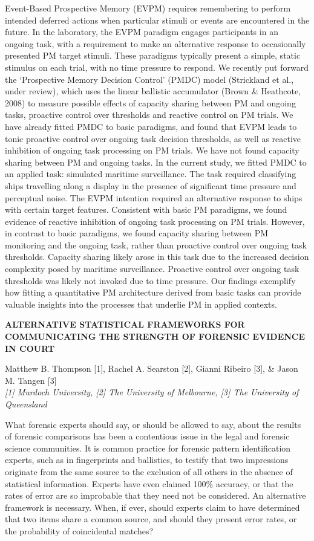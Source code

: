 \documentclass[]{article}
\begin{document}
Event-Based Prospective Memory (EVPM) requires remembering to perform
intended deferred actions when particular stimuli or events are
encountered in the future. In the laboratory, the EVPM paradigm engages
participants in an ongoing task, with a requirement to make an
alternative response to occasionally presented PM target stimuli. These
paradigms typically present a simple, static stimulus on each trial,
with no time pressure to respond. We recently put forward the
`Prospective Memory Decision Control' (PMDC) model (Strickland et al.,
under review), which uses the linear ballistic accumulator (Brown \&
Heathcote, 2008) to measure possible effects of capacity sharing between
PM and ongoing tasks, proactive control over thresholds and reactive
control on PM trials. We have already fitted PMDC to basic paradigms,
and found that EVPM leads to tonic proactive control over ongoing task
decision thresholds, as well as reactive inhibition of ongoing task
processing on PM trials. We have not found capacity sharing between PM
and ongoing tasks. In the current study, we fitted PMDC to an applied
task: simulated maritime surveillance. The task required classifying
ships travelling along a display in the presence of significant time
pressure and perceptual noise. The EVPM intention required an
alternative response to ships with certain target features. Consistent
with basic PM paradigms, we found evidence of reactive inhibition of
ongoing task processing on PM trials. However, in contrast to basic
paradigms, we found capacity sharing between PM monitoring and the
ongoing task, rather than proactive control over ongoing task
thresholds. Capacity sharing likely arose in this task due to the
increased decision complexity posed by maritime surveillance. Proactive
control over ongoing task thresholds was likely not invoked due to time
pressure. Our findings exemplify how fitting a quantitative PM
architecture derived from basic tasks can provide valuable insights into
the processes that underlie PM in applied contexts.\\
\pagebreak  

\textbf{ALTERNATIVE STATISTICAL FRAMEWORKS FOR COMMUNICATING THE
STRENGTH OF FORENSIC EVIDENCE IN COURT}

Matthew B. Thompson {[}1{]}, Rachel A. Searston {[}2{]}, Gianni Ribeiro
{[}3{]}, \& Jason M. Tangen {[}3{]}\\
\emph{{[}1{]} Murdoch University, {[}2{]} The University of Melbourne,
{[}3{]} The University of Queensland}

What forensic experts should say, or should be allowed to say, about the
results of forensic comparisons has been a contentious issue in the
legal and forensic science communities. It is common practice for
forensic pattern identification experts, such as in fingerprints and
ballistics, to testify that two impressions originate from the same
source to the exclusion of all others in the absence of statistical
information. Experts have even claimed 100\% accuracy, or that the rates
of error are so improbable that they need not be considered. An
alternative framework is necessary. When, if ever, should experts claim
to have determined that two items share a common source, and should they
present error rates, or the probability of coincidental matches?
\end{document}
